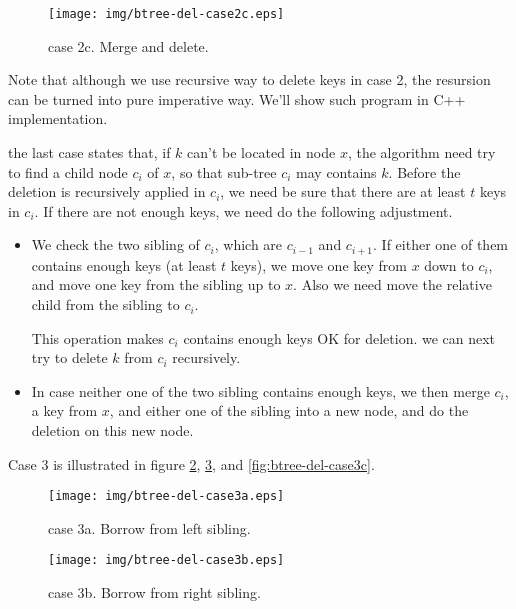 \documentclass{article}
\begin{document}
\begin{figure}[htbp]
  \begin{center}
    \texttt{[image: img/btree-del-case2c.eps]}
    \caption{case 2c. Merge and delete.} \label{fig:btree-del-case2c}
  \end{center}
\end{figure}

Note that although we use recursive way to delete keys in case 2, the 
resursion can be turned into pure imperative way. We'll show such
program in C++ implementation.

the last case states that, if $k$ can't be located in node $x$, the algorithm
need try to find a child node $c_i$ of $x$, so that sub-tree $c_i$ may 
contains $k$. Before the deletion is recursively applied in $c_i$, we
need be sure that there are at least $t$ keys in $c_i$. If there are
not enough keys, we need do the following adjustment.

\begin{itemize}
\item We check the two sibling of $c_i$, which are $c_{i-1}$ and $c_{i+1}$.
If either one of them contains enough keys (at least $t$ keys), we move
one key from $x$ down to $c_i$, and move one key from the sibling up to
$x$. Also we need move the relative child from the sibling to $c_i$.

This operation makes $c_i$ contains enough keys OK for deletion. we can
next try to delete $k$ from $c_i$ recursively.

\item In case neither one of the two sibling contains enough keys, we then 
merge $c_i$, a key from $x$, and either one of the sibling into a new
node, and do the deletion on this new node.
\end{itemize}

Case 3 is illustrated in figure \ref{fig:btree-del-case3a}, \ref{fig:btree-del-case3b},
and \ref{fig:btree-del-case3c}.

\begin{figure}[htbp]
  \begin{center}
    \texttt{[image: img/btree-del-case3a.eps]}
    \caption{case 3a. Borrow from left sibling.} \label{fig:btree-del-case3a}
  \end{center}
\end{figure}

\begin{figure}[htbp]
  \begin{center}
    \texttt{[image: img/btree-del-case3b.eps]}
    \caption{case 3b. Borrow from right sibling.} \label{fig:btree-del-case3b}
  \end{center}
\end{figure}
\end{document}
